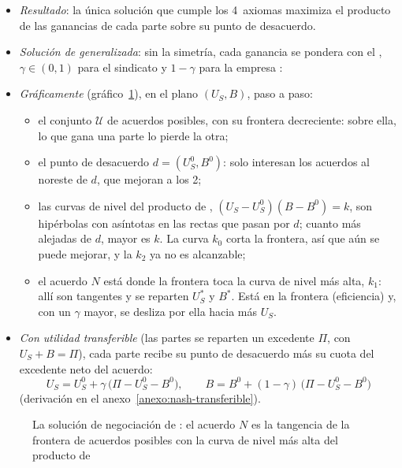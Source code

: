 \documentclass[11pt]{article}
\begin{document}
\begin{itemize}
\item \emph{Resultado}: la única solución que cumple los 4~axiomas maximiza el producto de las ganancias de cada parte sobre su punto de desacuerdo.
\item \emph{Solución de  generalizada}: sin la simetría\nocite{Kalai1977Nonsymmetric}, cada ganancia se pondera con el , $\gamma\in(0,1)$ para el sindicato y $1-\gamma$ para la empresa :
\item \emph{Gráficamente} (gráfico~\ref{fig:nash}), en el plano $(U_S,B)$, paso a paso:
  \begin{itemize}
  \item el conjunto $\mathcal{U}$ de acuerdos posibles, con su frontera decreciente: sobre ella, lo que gana una parte lo pierde la otra;
  \item el punto de desacuerdo $d=(U_S^0,B^0)$: solo interesan los acuerdos al noreste de $d$, que mejoran a los 2;
  \item las curvas de nivel del producto de , $(U_S-U_S^0)(B-B^0)=k$, son hipérbolas con asíntotas en las rectas que pasan por $d$; cuanto más alejadas de $d$, mayor es $k$. La curva $k_0$ corta la frontera, así que aún se puede mejorar, y la $k_2$ ya no es alcanzable;
  \item el acuerdo $N$ está donde la frontera toca la curva de nivel más alta, $k_1$: allí son tangentes y se reparten $U_S^*$ y $B^*$. Está en la frontera (eficiencia) y, con un $\gamma$ mayor, se desliza por ella hacia más $U_S$.
  \end{itemize}
\item \emph{Con utilidad transferible} (las partes se reparten un excedente $\Pi$, con $U_S+B=\Pi$), cada parte recibe su punto de desacuerdo más su cuota del excedente neto del acuerdo:
  \begin{equation}
  U_S=U_S^0+\gamma\,\big(\Pi-U_S^0-B^0\big),\qquad B=B^0+(1-\gamma)\,\big(\Pi-U_S^0-B^0\big) \label{eq:nash-transferible}
  \end{equation}
  (derivación en el anexo~\ref{anexo:nash-transferible}).
\end{itemize}

\begin{figure}[H]
\centering
\caption{La solución de negociación de : el acuerdo $N$ es la tangencia de la frontera de acuerdos posibles con la curva de nivel más alta del producto de }\label{fig:nash}
\end{figure}
\end{document}
